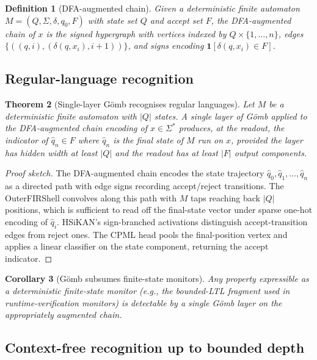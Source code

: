 \documentclass[11pt,a4paper]{article}
\newtheorem{theorem}{Theorem}[section]
\newtheorem{corollary}[theorem]{Corollary}
\newtheorem{definition}[theorem]{Definition}
\newcommand{\Gomb}{G\"omb}
\begin{document}
\begin{definition}[DFA-augmented chain]
Given a deterministic finite automaton $M = (Q, \Sigma, \delta,
q_0, F)$ with state set $Q$ and accept set $F$, the DFA-augmented
chain of $x$ is the signed hypergraph with vertices indexed by
$Q \times \{1, \ldots, n\}$, edges $\{((q, i), (\delta(q, x_i),
i+1))\}$, and signs encoding $\mathbf{1}[\delta(q, x_i) \in F]$.
\end{definition}

\subsection{Regular-language recognition}

\begin{theorem}[Single-layer \Gomb{} recognises regular languages]
\label{thm:regular}
Let $M$ be a deterministic finite automaton with $|Q|$ states. A
single layer of \Gomb{} applied to the DFA-augmented chain
encoding of $x \in \Sigma^*$ produces, at the readout, the
indicator of $\hat{q}_n \in F$ where $\hat{q}_n$ is the final
state of $M$ run on $x$, provided the layer has hidden width at
least $|Q|$ and the readout has at least $|F|$ output components.
\end{theorem}

\begin{proof}[Proof sketch]
The DFA-augmented chain encodes the state trajectory $\hat{q}_0,
\hat{q}_1, \ldots, \hat{q}_n$ as a directed path with edge signs
recording accept/reject transitions. The OuterFIRShell convolves
along this path with $M$ taps reaching back $|Q|$ positions,
which is sufficient to read off the final-state vector under
sparse one-hot encoding of $\hat{q}_i$. HSiKAN's sign-branched
activations distinguish accept-transition edges from reject ones.
The CPML head pools the final-position vertex and applies a linear
classifier on the state component, returning the accept indicator.
\end{proof}

\begin{corollary}[\Gomb{} subsumes finite-state monitors]
Any property expressible as a deterministic finite-state monitor
(e.g., the bounded-LTL fragment used in
runtime-verification monitors) is detectable by a single
\Gomb{} layer on the appropriately augmented chain.
\end{corollary}

\subsection{Context-free recognition up to bounded depth}
\end{document}
